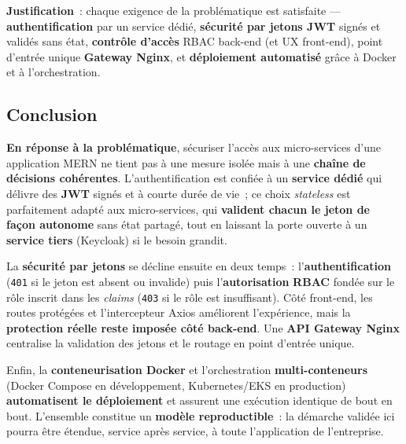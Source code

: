 \vspace{0.2cm}

\noindent \textbf{Justification}~: chaque exigence de la problématique est satisfaite — \textbf{authentification} par un service dédié, \textbf{sécurité par jetons JWT} signés et validés sans état, \textbf{contrôle d'accès} RBAC back-end (et UX front-end), point d'entrée unique \textbf{Gateway Nginx}, et \textbf{déploiement automatisé} grâce à Docker et à l'orchestration.

\newpage

\subsection*{Conclusion}
{}
\noindent \textbf{En réponse à la problématique}, sécuriser l'accès aux micro-services d'une application MERN ne tient pas à une mesure isolée mais à une \textbf{chaîne de décisions cohérentes}. L'authentification est confiée à un \textbf{service dédié} qui délivre des \textbf{JWT} signés et à courte durée de vie~; ce choix \textit{stateless} est parfaitement adapté aux micro-services, qui \textbf{valident chacun le jeton de façon autonome} sans état partagé, tout en laissant la porte ouverte à un \textbf{service tiers} (Keycloak) si le besoin grandit.

\vspace{0.2cm}

\noindent La \textbf{sécurité par jetons} se décline ensuite en deux temps~: l'\textbf{authentification} (\texttt{401} si le jeton est absent ou invalide) puis l'\textbf{autorisation} \textbf{RBAC} fondée sur le rôle inscrit dans les \textit{claims} (\texttt{403} si le rôle est insuffisant). Côté front-end, les routes protégées et l'intercepteur Axios améliorent l'expérience, mais la \textbf{protection réelle reste imposée côté back-end}. Une \textbf{API Gateway Nginx} centralise la validation des jetons et le routage en point d'entrée unique.

\vspace{0.2cm}

\noindent Enfin, la \textbf{conteneurisation Docker} et l'orchestration \textbf{multi-conteneurs} (Docker Compose en développement, Kubernetes/EKS en production) \textbf{automatisent le déploiement} et assurent une exécution identique de bout en bout. L'ensemble constitue un \textbf{modèle reproductible}~: la démarche validée ici pourra être étendue, service après service, à toute l'application de l'entreprise.


